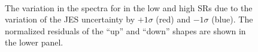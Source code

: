 \begin{figure}[h]
  \centering
   \\
  \caption{The variation in the \ptmiss spectra for \ttll in the low and high \mttll SRs due to the variation of the JES uncertainty by $+1\sigma$ (red) and $-1\sigma$ (blue). The normalized residuals of the ``up'' and ``down'' shapes are shown in the lower panel.}
  \label{fig:JESshape}
\end{figure}

